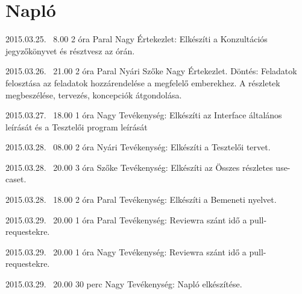 %
\section{Napló}

\begin{naplo}
	
	\bejegyzes
	{2015.03.25. ~8.00}
	{2 óra}
    {Paral Nagy} 
	{Értekezlet: Elkészíti a Konzultációs jegyzőkönyvet és résztvesz az órán.\newline } 
	
	\bejegyzes
	{2015.03.26. ~21.00}
	{2 óra}
	{Paral \newline Nyári \newline Szőke \newline Nagy} 
	{Értekezlet.
		Döntés: Feladatok felosztása az feladatok hozzárendelése a megfelelő emberekhez. A részletek megbeszélése, tervezés, koncepciók átgondolása.\newline } 

	\bejegyzes
	{2015.03.27. ~18.00}
	{1 óra}
	{Nagy} 
	{Tevékenység: Elkészíti az Interface általános leírását és a Tesztelői program leírását\newline } 			
	
	\bejegyzes
	{2015.03.28. ~08.00}
	{2 óra}
	{Nyári} 
	{Tevékenység: Elkészíti a Tesztelői tervet.\newline }
	
	\bejegyzes
	{2015.03.28. ~20.00}
	{3 óra}
	{Szőke} 
	{Tevékenység: Elkészíti az Összes részletes use-caset.\newline }	

    \bejegyzes
    {2015.03.28. ~18.00}
    {2 óra}
    {Paral} 
    {Tevékenység: Elkészíti a Bemeneti nyelvet.\newline } 

    \bejegyzes
    {2015.03.29. ~20.00}
    {1 óra}
    {Paral} 
    {Tevékenység: Reviewra szánt idő a pull-requestekre.\newline } 

    \bejegyzes
    {2015.03.29. ~20.00}
    {1 óra}
    {Nagy} 
    {Tevékenység: Reviewra szánt idő a pull-requestekre.\newline } 
    
	\bejegyzes
	{2015.03.29. ~20.00}
	{30 perc}
	{Nagy} 
	{Tevékenység: Napló elkészítése.\newline } 
	
\end{naplo}



